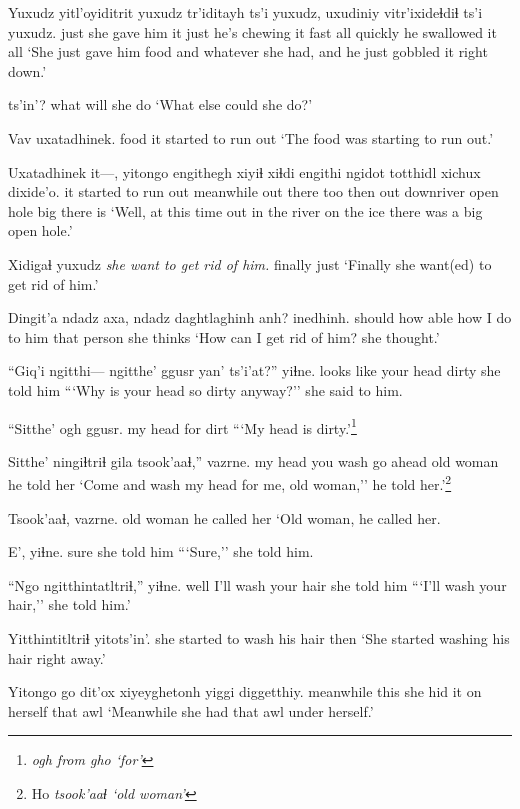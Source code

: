\documentclass[12pt]{article}
\begin{document}
\gll Yuxudz yitl'oyiditrit yuxudz tr'iditayh ts'i yuxudz, uxudiniy vitr'ixideɬdiɬ ts'i yuxudz.
just {she gave him it} just {he's chewing it fast} {} all quickly {he swallowed it} {} all
\glt `She just gave him food and whatever she had, and he just gobbled it right down.'
\glend

 ts'in'?
{what will she do} {}
\glt `What else could she do?'
\glend

\gll Vav uxatadhinek.
food {it started to run out}
\glt `The food was starting to run out.'
\glend

\gll Uxatadhinek it---, yitongo engithegh xiyiɬ xiɬdi engithi ngidot totthidl xichux dixide'o.
{it started to run out} {} meanwhile {out there} too then out downriver {open hole} big {there is}
\glt `Well, at this time out in the river on the ice there was a big open hole.'
\glend

\gll Xidigaɬ yuxudz {\em she want to get rid of him.}
finally just 
\glt `Finally she want(ed) to get rid of him.'
\glend

\gll Dingit'a ndadz axa, ndadz daghtlaghinh anh? inedhinh.
should how able how {I do to him} {that person} {she thinks}
\glt `How can I get rid of him? she thought.'
\glend

\gll ``Giq'i ngitthi--- ngitthe' {ggusr yan'} ts'i'at?'' yiɬne.
{looks like} {} {your head} dirty {} {she told him}
\glt ```Why is your head so dirty anyway?'' she said to him.
\glend

\gll ``Sitthe' ogh ggusr.
{my head} for dirt
\glt ```My head is dirty.'\footnote{\em ogh \em from \em gho \em `for'}
\glend

\gll Sitthe' ningiɬtriɬ gila tsook'aaɬ,'' vazrne.
{my head} {you wash} {go ahead} {old woman} {he told her}
\glt `Come and wash my head for me, old woman,'' he told her.'\footnote{Ho \em tsook'aaɬ \em `old woman'}
\glend

\gll Tsook'aaɬ, vazrne.
{old woman} {he called her}
\glt `Old woman, he called her.
\glend

\gll E', yiɬne.
sure {she told him}
\glt ```Sure,'' she told him.
\glend

\gll ``Ngo ngitthintatltriɬ,'' yiɬne.
well {I'll wash your hair} {she told him}
\glt ```I'll wash your hair,'' she told him.'
\glend

\gll Yitthintitltriɬ yitots'in'.
{she started to wash his hair} then
\glt `She started washing his hair right away.'
\glend

\gll Yitongo go {dit'ox xiyeyghetonh} yiggi diggetthiy.
meanwhile this {she hid it on herself} that awl
\glt `Meanwhile she had that awl under herself.'
\glend
\end{document}
